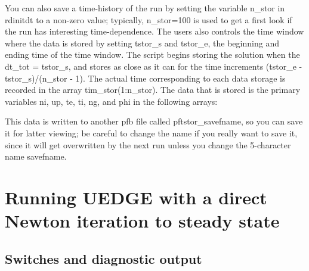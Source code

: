 \documentclass [12pt]{article}
\def\hsa{\hskip.4truein}
\begin{document}
You can also save a time-history of the run by setting the variable {\sf
  n\_stor} in {\sf rdinitdt} to a non-zero value; typically, {\sf n\_stor=100}
is used to get a first look if the run has interesting time-dependence.  The
users also controls the time window where the data is stored by setting {\sf
  tstor\_s} and {\sf tstor\_e}, the beginning and ending time of the time
window.  The script begins storing the solution when the {\sf dt\_tot =
  tstor\_s}, and stores as close as it can for the time increments {\sf
  (tstor\_e - tstor\_s)/(n\_stor - 1)}.  The actual time corresponding to each
data storage is recorded in the array {\sf tim\_stor(1:n\_stor)}.  The data
that is stored is the primary variables {\sf ni, up, te, ti, ng,} and {\sf
  phi} in the following arrays:
%

This data is written to another pfb file called {\sf pftstor\_savefname}, so
you can save it for latter viewing; be careful to change the name if you
really want to save it, since it will get overwritten by the next run unless
you change the 5-character name savefname.


\section{Running {\sf UEDGE} with a direct Newton iteration to steady state}

\subsection{Switches and diagnostic output}
\end{document}
